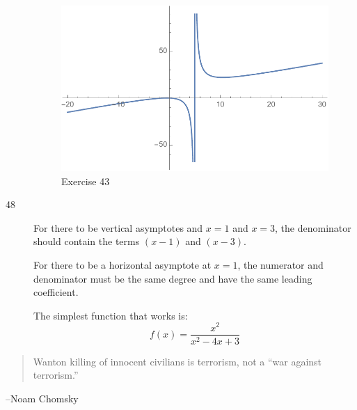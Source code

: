 \documentclass[letterpaper]{exam}
\begin{document}
\begin{description}
        \begin{figure}[H]
          \centering
          \includegraphics[scale = 0.5]{ex43.pdf}
          \caption{Exercise 43}
          \label{fig:ex43}
        \end{figure}

      \newpage

      \item[48] For there to be vertical asymptotes and $x = 1$ and $x = 3$, the
        denominator should contain the terms $(x - 1)$ and $(x - 3)$.

        For there to be a horizontal asymptote at $x = 1$, the numerator and denominator
        must be the same degree and have the same leading coefficient.

        The simplest function that works is:
        \[
          \boxed{ f(x) = \frac{x^2}{x^2 - 4x + 3} }
        \]
    \end{description}

  \else
    \vspace{11 cm}
    \begin{quote}
      \begin{em}
        Wanton killing of innocent civilians is terrorism, not a ``war against
        terrorism.'' 
      \end{em}
    \end{quote}
    \hspace{1 cm} --Noam Chomsky
  \fi
\end{document}
